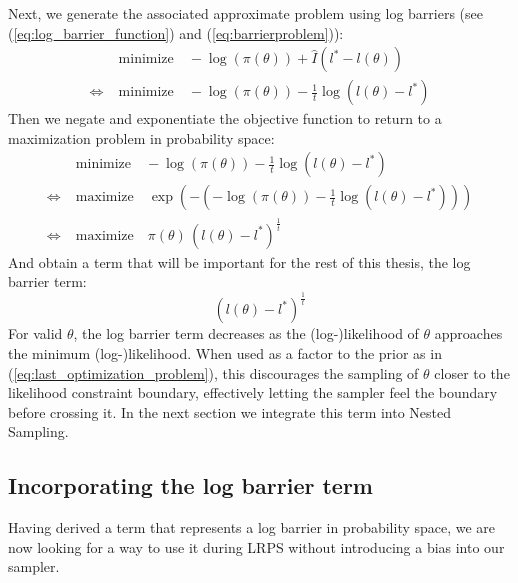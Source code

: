\documentclass[12pt, a4paper]{report}
\begin{document}
Next, we generate the associated approximate problem using log barriers (see (\ref{eq:log_barrier_function}) and (\ref{eq:barrierproblem})):
\begin{align*}
    &\textrm{minimize} \quad -\log(\pi(\theta)) + \hat{I}(l^* - l(\theta)) \\
    \iff \; &\textrm{minimize} \quad -\log(\pi(\theta)) - \frac{1}{t}\log(l(\theta) - l^*)
\end{align*}
Then we negate and exponentiate the objective function to return to a maximization problem in probability space:
\begin{align}
    &\textrm{minimize} \quad -\log(\pi(\theta)) - \frac{1}{t}\log(l(\theta) - l^*) \nonumber\\
    \iff \; &\textrm{maximize} \quad \exp(-(-\log(\pi(\theta)) - \frac{1}{t}\log(l(\theta) - l^*))) \nonumber\\
    \iff \; &\textrm{maximize} \quad \pi(\theta) \, (l(\theta) - l^*)^{\frac{1}{t}} \label{eq:last_optimization_problem}
\end{align}
And obtain a term that will be important for the rest of this thesis, the log barrier term:
\begin{equation}
    (l(\theta) - l^*)^\frac{1}{t} \label{eq:log_barrier_term}
\end{equation}
For valid $\theta$, the log barrier term decreases as the (log-)likelihood of $\theta$ approaches the minimum (log-)likelihood.
When used as a factor to the prior as in (\ref{eq:last_optimization_problem}), this discourages the sampling of $\theta$ closer to the likelihood constraint boundary, effectively letting the sampler feel the boundary before crossing it.
In the next section we integrate this term into Nested Sampling.

\subsection{Incorporating the log barrier term}
Having derived a term that represents a log barrier in probability space, we are now looking for a way to use it during LRPS without introducing a bias into our sampler.
\end{document}
